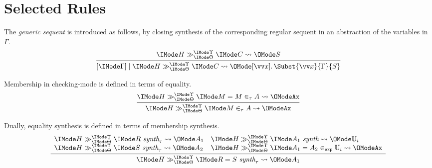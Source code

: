 \section{Selected Rules}

The \emph{generic sequent} is introduced as follows, by closing synthesis of the corresponding
regular sequent in an abstraction of the variables in $\Gamma$.
\[
  \infer{
    \GenericPRLSequent{\Gamma}{H}{\Theta}{\Upsilon}{C}{
      \MkAbs{}{\vec{x}}{\Subst{\vec{x}}{\Gamma}{S}}
    }
  }{
    \PRLSequent{H}{\Theta}{\Upsilon}{C}{S}
  }
\]

Membership in checking-mode is defined in terms of equality.
\[
  \infer{
    \PRLSequent{H}{\Theta}{\Upsilon}{M \in_\tau A}{\mathtt{Ax}}
  }{
    \PRLSequent{H}{\Theta}{\Upsilon}{M = M \in_\tau A}{\mathtt{Ax}}
  }
\]

Dually, equality synthesis is defined in terms of membership synthesis.
\[
  \infer{
    \PRLSequent{H}{\Theta}{\Upsilon}{R = S\ \textit{synth}_\tau}{A_1}
  }{
    \begin{array}{l}
      \PRLSequent{H}{\Theta}{\Upsilon}{R\ \textit{synth}_\tau}{A_1}\\
      \PRLSequent{H}{\Theta}{\Upsilon}{S\ \textit{synth}_\tau}{A_2}
    \end{array}
    \begin{array}{l}
      \PRLSequent{H}{\Theta}{\Upsilon}{A_1\ \textit{synth}}{\mathbb{U}_i}\\
      \PRLSequent{H}{\Theta}{\Upsilon}{A_1=A_2\in_\AbtSortExp \mathbb{U}_i}{\mathtt{Ax}}
    \end{array}
  }
\]

